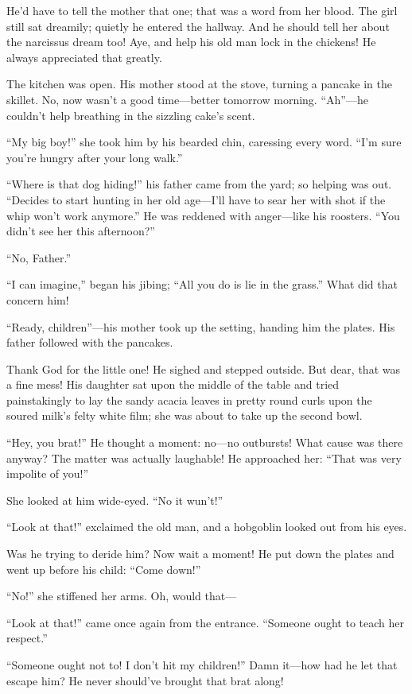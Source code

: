 \documentclass[12pt,a4paper]{article}
\begin{document}
He’d have to tell the mother that one; that was a word from her blood. The girl still sat dreamily; quietly he entered the hallway. And he should tell her about the narcissus dream too! Aye, and help his old man lock in the chickens! He always appreciated that greatly.

The kitchen was open. His mother stood at the stove, turning a pancake in the skillet. No, now wasn’t a good time—better tomorrow morning. “Ah”—he couldn’t help breathing in the sizzling cake’s scent.

“My big boy!” she took him by his bearded chin, caressing every word. “I’m sure you’re hungry after your long walk.”

“Where is that dog hiding!” his father came from the yard; so helping was out. “Decides to start hunting in her old age—I’ll have to sear her with shot if the whip won’t work anymore.” He was reddened with anger—like his roosters. “You didn’t see her this afternoon?”

“No, Father.”

“I can imagine,” began his jibing; “All you do is lie in the grass.” What did that concern him!

“Ready, children”—his mother took up the setting, handing him the plates. His father followed with the pancakes.

Thank God for the little one! He sighed and stepped outside. But dear, that was a fine mess! His daughter sat upon the middle of the table and tried painstakingly to lay the sandy acacia leaves in pretty round curls upon the soured milk’s felty white film; she was about to take up the second bowl.

“Hey, you brat!” He thought a moment: no—no outbursts! What cause was there anyway? The matter was actually laughable! He approached her: “That was very impolite of you!”

She looked at him wide-eyed. “No it wun’t!”

“Look at that!” exclaimed the old man, and a hobgoblin looked out from his eyes.

Was he trying to deride him? Now wait a moment! He put down the plates and went up before his child: “Come down!”

“No!” she stiffened her arms. Oh, would that—

“Look at that!” came once again from the entrance. “Someone ought to teach her respect.”

“Someone ought not to! I don’t hit my children!” Damn it—how had he let that escape him? He never should’ve brought that brat along!
\end{document}
